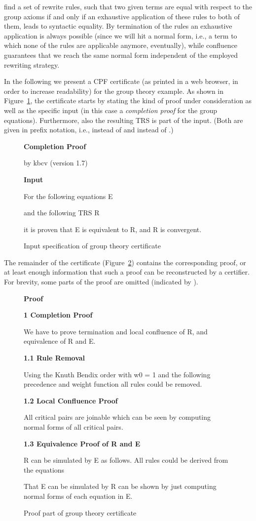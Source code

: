 \documentclass[USenglish]{eptcs}
\newenvironment{cpfsnip}{\begin{lrbox}{\cpfbox}\begin{minipage}{0.95\textwidth}}{\end{minipage}\end{lrbox}\begin{center}\fbox{\usebox{\cpfbox}}\end{center}}
\newlength{\len}
\newcommand\hi[1]{\par\textbf{\Large#1}\par}
\newcommand\hii[1]{\par\smallskip\textbf{\large#1}\par}
\newcommand\hiii[1]{\par\smallskip\textbf{#1}\par}
\newcommand\figref[1]{Figure~\ref{fig:#1}}
\begin{document}
find a set of rewrite rules, such that two given terms are equal with respect to
the group axioms if and only if an exhaustive application of these rules to both
of them, leads to syntactic equality. By termination of the rules an exhaustive
application is always possible (since we will hit a normal form, i.e., a term to
which none of the rules are applicable anymore, eventually), while confluence
guarantees that we reach the same normal form independent of the employed
rewriting strategy.

In the following we present a CPF certificate (as printed in a web browser, in
order to increase readability) for the group theory example. As shown in
\figref{ini}, the certificate starts by stating the kind of proof under
consideration as well as the specific input (in this case a \emph{completion
proof} for the group equations). Furthermore, also the resulting TRS is part of
the input. (Both are given in prefix notation, i.e.,  instead of  and  instead of
.)

\begin{figure}
\begin{cpfsnip}
\hi{Completion Proof}
by kbcv (version 1.7)
\hii{Input}
For the following equations E

and the following TRS R

it is proven that E is equivalent to R, and R is convergent.
\end{cpfsnip}
\caption{\label{fig:ini}Input specification of group theory certificate}
\end{figure}

The remainder of the certificate (\figref{proof}) contains the corresponding
proof, or at least enough information that such a proof can be reconstructed by
a certifier. For brevity, some parts of the proof are omitted (indicated by
).

\begin{figure}
\begin{cpfsnip}
\hii{Proof}
\hiii{1 Completion Proof}
We have to prove termination and local confluence of R, and equivalence of R and
E.
\hiii{1.1 Rule Removal}
Using the Knuth Bendix order with w0 = 1 and the following precedence and weight
function  all rules could be removed.
\hiii{1.2 Local Confluence Proof}
All critical pairs are joinable which can be seen by computing normal forms of
all critical pairs.
\hiii{1.3 Equivalence Proof of R and E}
R can be simulated by E as follows. All rules could be derived from the
equations

That E can be simulated by R can be shown by just computing normal forms of
each equation in E.
\end{cpfsnip}
\caption{\label{fig:proof}Proof part of group theory certificate}
\end{figure}
\end{document}
